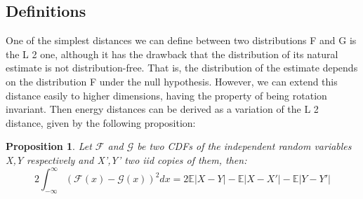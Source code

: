 \documentclass[8pt,a4paper]{article}
\theoremstyle{plain}
\newtheorem{prop}[thm]{Proposition}
\theoremstyle{definition}
\theoremstyle{remark}
\providecommand{\abs}[1]{\lvert#1\rvert}
\begin{document}
\subsection{Definitions}
One of the simplest distances we can define between two distributions F and G is the L 2 one,
although it has the drawback that the distribution of its natural estimate is not distribution-free.
That is, the distribution of the estimate depends on the distribution F under the null hypothesis.
However, we can extend this distance easily to higher dimensions, having the property of being
rotation invariant. Then energy distances can be derived as a variation of the L 2 distance, given
by the following proposition:
\begin{prop}
Let $\mathcal{F}$ and $\mathcal{G}$ be two CDFs of the independent random variables X,Y respectively and  X',Y' two iid copies of them, then:
$$
2\int_{-\infty}^{\infty}(\mathcal{F}(x) - \mathcal{G}(x))^{2} dx = 2\mathbb{E}\abs{X-Y} - \mathbb{E}\abs{X-X'} -\mathbb{E}\abs{Y-Y'}  
$$
\end{prop}
\end{document}
